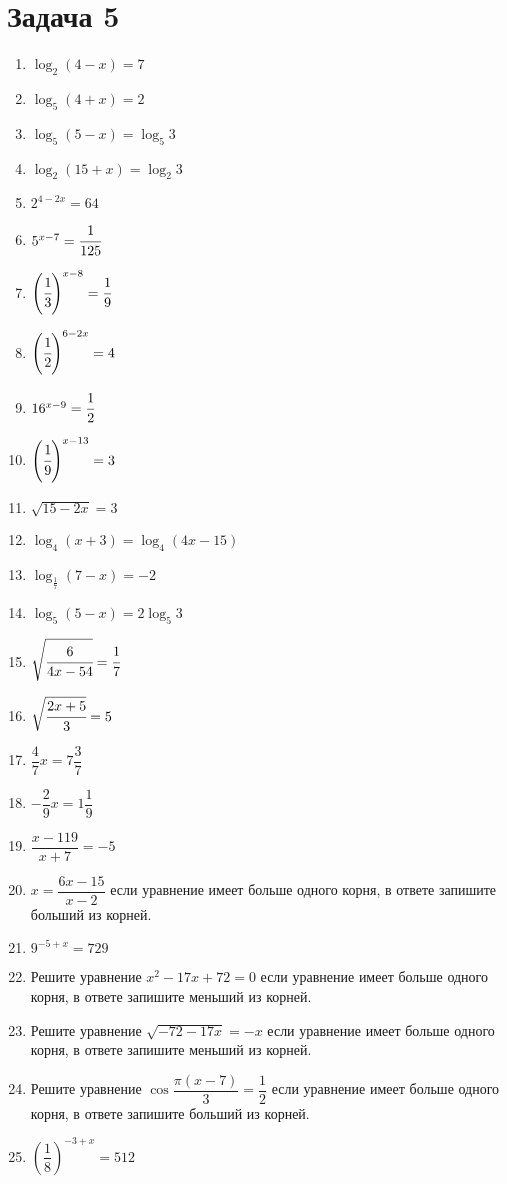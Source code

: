 \chapter{Задача 5}	
	\begin{enumerate}
		
	\item $ \log_{2}\left(4-x\right)=7 $
	\item $ \log_{5}\left(4+x\right)=2 $
	\item $ \log_{5}\left(5-x\right)=\log_{5}3 $
	\item $ \log_{2}\left(15+x\right)=\log_{2}3 $
	\item $ 2^{4-2x} = 64$
	\item $ 5^{x-7} = \cfrac{1}{125} $
	\item $ \left( \cfrac{1}{3}\right)^{x-8} = \cfrac{1}{9}$
	\item $ \left( \cfrac{1}{2}\right)^{6-2x} = 4$
	\item $ 16^{x-9} = \cfrac{1}{2} $
	\item $ \left( \cfrac{1}{9}\right) ^{x-13} = 3$
	\item $ \sqrt{15 - 2x} = 3  $
	\item $ \log_{4}\left(x+3\right) = \log_{4}\left(4x-15\right)$
	\item $ \log_{\frac{1}{7}}\left(7-x\right) = -2 $
	\item $ \log_{5}\left(5-x\right) = 2\log_{5}3 $
	\item $ \sqrt{\cfrac{6}{4x-54}} = \cfrac{1}{7} $
	\item $ \sqrt{\cfrac{2x+5}{3}} = 5 $
	\item $ \dfrac{4}{7}x = 7\dfrac{3}{7} $
	\item $ -\dfrac{2}{9}x = 1\dfrac{1}{9}$
	\item $ \dfrac{x-119}{x+7} = -5 $
	\item $ x = \dfrac{6x -15}{x-2}$ если уравнение имеет больше одного корня, в ответе запишите больший из корней.
	\item $ 9^{-5+x} = 729$ 
	\item Решите уравнение $ x^2 -17x + 72 = 0 $ если уравнение имеет больше одного корня, в ответе запишите меньший из корней.
	\item Решите уравнение $\sqrt{-72-17x} = -x$ если уравнение имеет больше одного корня, в ответе запишите меньший из корней.
	\item Решите уравнение $\cos{\dfrac{\pi(x-7)}{3}}  =  \dfrac{1}{2}$ если уравнение имеет больше одного корня, в ответе запишите больший из корней.
	\item $\left( \dfrac{1}{8}\right)^{-3+x} = 512 $

\end{enumerate}
